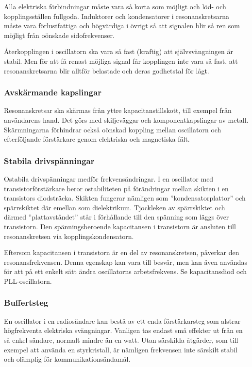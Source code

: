 Alla elektriska förbindningar måste vara så korta som möjligt och löd- och
kopplingsställen fullgoda.
Induktorer och kondensatorer i resonanskretsarna måste vara förlustfattiga
och högvärdiga i övrigt så att signalen blir så ren som möjligt från oönskade
sidofrekvenser.

Återkopplingen i oscillatorn ska vara så fast (kraftig) att självsvängningen
är stabil.
Men för att få renast möjliga signal får kopplingen inte vara så fast,
att resonanskretsarna blir alltför belastade och deras godhetstal för lågt.

\subsubsection{Avskärmande kapslingar}

Resonanskretsar ska skärmas från yttre kapacitanstillskott, till exempel från
användarens hand.
Det görs med skiljeväggar och komponentkapslingar av metall.
Skärmningarna förhindrar också oönskad koppling mellan oscillatorn och
efterföljande förstärkare genom elektriska och magnetiska fält.

\newpage
\subsubsection{Stabila drivspänningar}

Ostabila drivspänningar medför frekvensändringar.
I en oscillator med transistorförstärkare beror ostabiliteten på förändringar
mellan skikten i en transistors diodsträcka.
Skikten fungerar nämligen som ''kondensatorplattor'' och spärrskiktet där
emellan som dielektrikum.
Tjockleken av spärrskiktet och därmed ''plattavståndet'' står i förhållande
till den spänning som läggs över transistorn.
Den spänningsberoende kapacitansen i transistorn är ansluten till
resonanskretsen via kopplingskondensatorn.

Eftersom kapacitansen i transistorn är en del av resonanskretsen, påverkar
den resonansfrekvensen.
Denna egenskap kan vara till besvär, men kan även användas för att på ett
enkelt sätt ändra oscillatorns arbetsfrekvens.
Se kapacitansdiod och PLL-oscillatorn.

\subsubsection{Buffertsteg}
\label{buffertsteg}

En oscillator i en radiosändare kan bestå av ett enda förstärkarsteg
som alstrar högfrekventa elektriska svängningar.
Vanligen tas endast små effekter ut från en så enkel sändare, normalt mindre än
en watt.
Utan särskilda åtgärder, som till exempel att använda en styrkristall, är nämligen
frekvensen inte särskilt stabil och olämplig för kommunikationsändamål.

